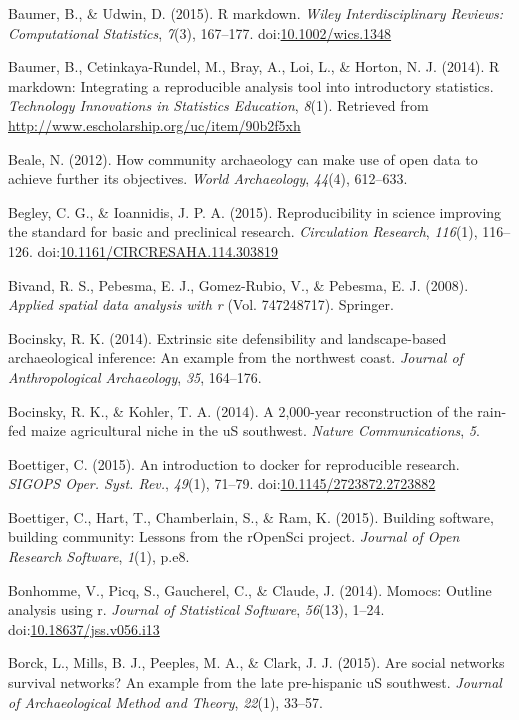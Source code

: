 \documentclass[american,man]{apa6}
\begin{document}
Baumer, B., \& Udwin, D. (2015). R markdown. \emph{Wiley
Interdisciplinary Reviews: Computational Statistics}, \emph{7}(3),
167--177.
doi:\href{http://dx.doi.org/10.1002/wics.1348}{10.1002/wics.1348}

Baumer, B., Cetinkaya-Rundel, M., Bray, A., Loi, L., \& Horton, N. J.
(2014). R markdown: Integrating a reproducible analysis tool into
introductory statistics. \emph{Technology Innovations in Statistics
Education}, \emph{8}(1). Retrieved from
\url{http://www.escholarship.org/uc/item/90b2f5xh}

Beale, N. (2012). How community archaeology can make use of open data to
achieve further its objectives. \emph{World Archaeology}, \emph{44}(4),
612--633.

Begley, C. G., \& Ioannidis, J. P. A. (2015). Reproducibility in science
improving the standard for basic and preclinical research.
\emph{Circulation Research}, \emph{116}(1), 116--126.
doi:\href{http://dx.doi.org/10.1161/CIRCRESAHA.114.303819}{10.1161/CIRCRESAHA.114.303819}

Bivand, R. S., Pebesma, E. J., Gomez-Rubio, V., \& Pebesma, E. J.
(2008). \emph{Applied spatial data analysis with r} (Vol. 747248717).
Springer.

Bocinsky, R. K. (2014). Extrinsic site defensibility and landscape-based
archaeological inference: An example from the northwest coast.
\emph{Journal of Anthropological Archaeology}, \emph{35}, 164--176.

Bocinsky, R. K., \& Kohler, T. A. (2014). A 2,000-year reconstruction of
the rain-fed maize agricultural niche in the uS southwest. \emph{Nature
Communications}, \emph{5}.

Boettiger, C. (2015). An introduction to docker for reproducible
research. \emph{SIGOPS Oper. Syst. Rev.}, \emph{49}(1), 71--79.
doi:\href{http://dx.doi.org/10.1145/2723872.2723882}{10.1145/2723872.2723882}

Boettiger, C., Hart, T., Chamberlain, S., \& Ram, K. (2015). Building
software, building community: Lessons from the rOpenSci project.
\emph{Journal of Open Research Software}, \emph{1}(1), p.e8.

Bonhomme, V., Picq, S., Gaucherel, C., \& Claude, J. (2014). Momocs:
Outline analysis using r. \emph{Journal of Statistical Software},
\emph{56}(13), 1--24.
doi:\href{http://dx.doi.org/10.18637/jss.v056.i13}{10.18637/jss.v056.i13}

Borck, L., Mills, B. J., Peeples, M. A., \& Clark, J. J. (2015). Are
social networks survival networks? An example from the late pre-hispanic
uS southwest. \emph{Journal of Archaeological Method and Theory},
\emph{22}(1), 33--57.
\end{document}
